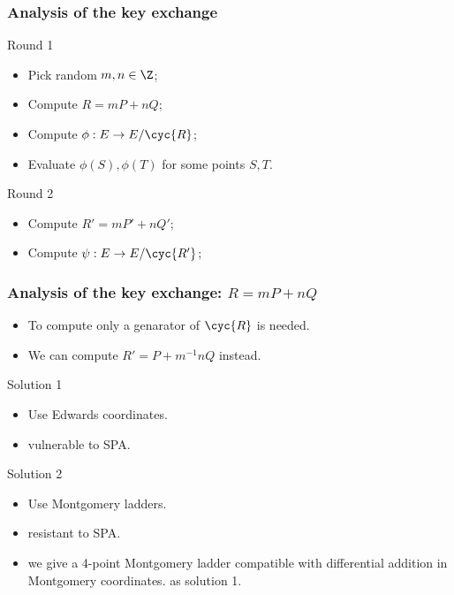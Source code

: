 \documentclass{beamer}
\renewcommand{\emph}[1]{}
\begin{document}
\begin{frame}
  \frametitle{Analysis of the key exchange}
  
  \begin{block}{Round 1}
    \begin{itemize}
    \item Pick random \alert{$m,n\in\Z$};
    \item Compute \alert{$R = mP + nQ$};
    \item Compute \alert{$\phi : E \to E/\cyc{R}$};
    \item Evaluate \alert{$\phi(S), \phi(T)$} for some points $S,T$.
    \end{itemize}
  \end{block}
  
  \begin{block}{Round 2}
    \begin{itemize}
    \item Compute \alert{$R' = mP' + nQ'$};
    \item Compute \alert{$\psi : E \to E/\cyc{R'}$};
    \end{itemize}
  \end{block}
\end{frame}


\begin{frame}
  \frametitle{Analysis of the key exchange: $R=mP+nQ$}

  \begin{itemize}
  \item To compute \emph{$\phi:E\to E/\cyc{R}$} only a
    \alert{genarator of $\cyc{R}$} is needed.
  \item We can compute \alert{$R'=P + m^{-1}nQ$} instead.
  \end{itemize}

  \begin{block}{Solution 1}
    \begin{itemize}
    \item Use Edwards coordinates.
    \item \emph{Drawback:} vulnerable to SPA.
    \end{itemize}
  \end{block}
  
  \begin{block}{Solution 2}
    \begin{itemize}
    \item Use Montgomery ladders.
    \item \emph{Security:} resistant to SPA.
    \item \emph{Efficiency:} we give a \alert{4-point Montgomery
        ladder} compatible with \alert{differential addition} in
      Montgomery coordinates. \emph{Nearly as efficient} as solution
      1.
    \end{itemize}
  \end{block}
\end{frame}
\end{document}
